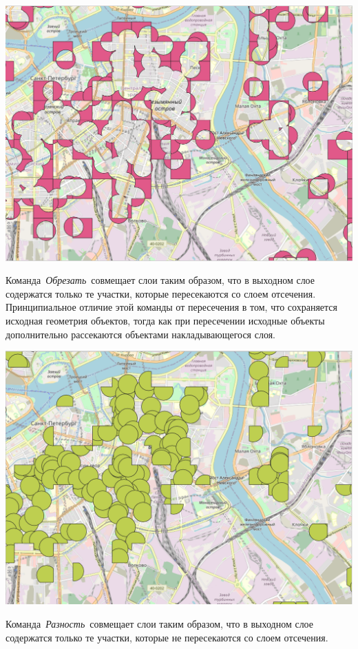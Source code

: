 \documentclass[
]{book}
\begin{document}
\includegraphics{figures/56.PNG}

Команда~\emph{Обрезать}~совмещает слои таким образом, что в выходном слое содержатся только те участки, которые пересекаются со слоем отсечения. Принципиальное отличие этой команды от пересечения в том, что сохраняется исходная геометрия объектов, тогда как при пересечении исходные объекты дополнительно рассекаются объектами накладывающегося слоя.

\includegraphics{figures/57.PNG}

Команда~\emph{Разность}~совмещает слои таким образом, что в выходном слое содержатся только те участки, которые не пересекаются со слоем отсечения.
\end{document}
